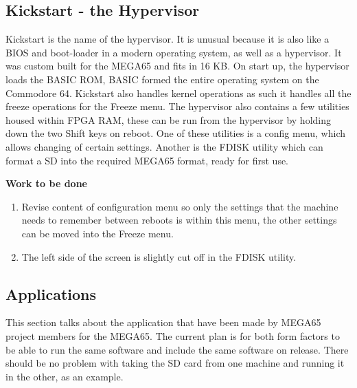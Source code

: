 \subsection{Kickstart - the Hypervisor}
Kickstart is the name of the hypervisor. It is unusual because it is also like a BIOS and boot-loader in a modern operating system, as well as a hypervisor. It was custom built for the MEGA65 and fits in 16 KB. On start up, the hypervisor loads the BASIC ROM, BASIC formed the entire operating system on the Commodore 64. Kickstart also handles kernel operations as such it handles all the freeze operations for the Freeze menu. The hypervisor also contains a few utilities housed within FPGA RAM, these can be run from the hypervisor by holding down the two Shift keys on reboot. One of these utilities is a config menu, which allows changing of certain settings. Another is the FDISK utility which can format a SD into the required MEGA65 format, ready for first use.

\textbf{Work to be done}
\begin{enumerate}
\item Revise content of configuration menu so only the settings that the machine needs to remember between reboots is within this menu, the other settings can be moved into the Freeze menu.
\item The left side of the screen is slightly cut off in the FDISK utility.
\end{enumerate}



\subsection{Applications}
This section talks about the application that have been made by MEGA65 project members for the MEGA65. The current plan is for both form factors to be able to run the same software and include the same software on release. There should be no problem with taking the SD card from one machine and running it in the other, as an example.

